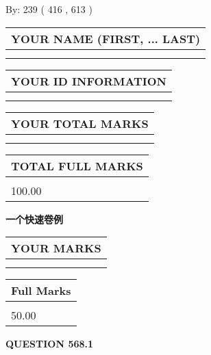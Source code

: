 \documentclass{ctexart}
\begin{document}
   
\hspace{1.0in} By: 
 239 ( 416 ,  613 )
   
   
   
   
\newpage 
\setcounter{page}{ 
   568001 } 
   
   
   
   
\noindent\begin{tabular}{|l|}
\hline
YOUR NAME (FIRST, ... LAST)  \\
\hline
 \\ 
 \\ 
\hline
\end{tabular}
\hspace{0.05in} \begin{tabular}{|l|}
\hline
 YOUR   ID   INFORMATION  \\
\hline
 \\ 
 \\ 
\hline
\end{tabular}
   
   
\vspace{0.2in}\noindent\begin{tabular}{|l|}
\hline
YOUR TOTAL MARKS  \\
\hline
 \\ 
 \\ 
\hline
\end{tabular}
\hspace{0.05in} \begin{tabular}{|l|}
\hline
TOTAL FULL MARKS  \\
\hline
 \\ 
100.00 \\
\hline
\end{tabular}
   
   
 \vspace{0.2in}
{\LARGE {\textbf{ 一个快速卷例}}}
   
   
  
\vspace{0.2in}
  
\noindent\begin{tabular}{|l|}
\hline
 YOUR MARKS  \\
\hline
 \\ 
 \\ 
\hline
\end{tabular}
\hspace{0.05in} \begin{tabular}{|l|}
\hline
 Full Marks  \\
\hline
 \\ 
50.00 \\
\hline
\end{tabular}
{\textbf{\Large{QUESTION
568.1 
}}}
  
\end{document}
